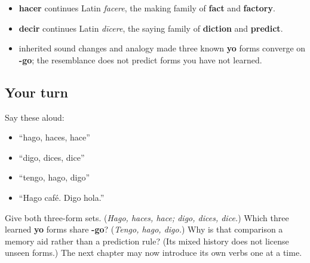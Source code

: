 \begin{cousinweb}
\begin{itemize}
\raggedright
  \item \textbf{hacer} continues Latin \emph{facere}, the making family of \textbf{fact} and \textbf{factory}.
  \item \textbf{decir} continues Latin \emph{dīcere}, the saying family of \textbf{diction} and \textbf{predict}.
  \item inherited sound changes and analogy made three known \textbf{yo} forms converge on \textbf{-go}; the resemblance does not predict forms you have not learned.
\end{itemize}
\end{cousinweb}

\subsection*{Your turn}
Say these aloud:

\begin{itemize}
\raggedright
  \item “hago, haces, hace”
  \item “digo, dices, dice”
  \item “tengo, hago, digo”
  \item “Hago café. Digo hola.”
\end{itemize}

\begin{tcolorbox}[breakable,colback=teal!4,colframe=teal!35!black,title={Before you move on}]
Give both three-form sets. (\emph{Hago, haces, hace; digo, dices, dice.}) Which three learned \textbf{yo} forms share \textbf{-go}? (\emph{Tengo, hago, digo.}) Why is that comparison a memory aid rather than a prediction rule? (Its mixed history does not license unseen forms.) The next chapter may now introduce its own verbs one at a time.
\end{tcolorbox}
